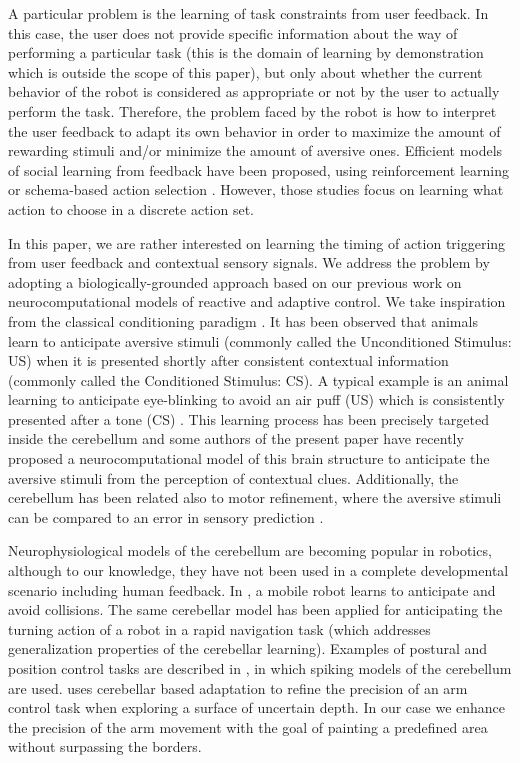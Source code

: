 \documentclass[letterpaper, 10 pt, conference]{ieeeconf}  %
\begin{document}
A particular problem is the learning of task constraints from user feedback. In this case, the user does not provide specific information about the way of performing a particular task (this is the domain of learning by demonstration which is outside the scope of this paper), but only about whether the current behavior of the robot is considered as appropriate or not by the user to actually perform the task. Therefore, the problem faced by the robot is how to interpret the user feedback to adapt its own behavior in order to maximize the amount of rewarding stimuli and/or minimize the amount of aversive ones. Efficient models of social learning from feedback have been proposed, using reinforcement learning \cite{blumberg2002integrated,isbell2001social} or schema-based action selection \cite{kaplan2002robotic}. However, those studies focus on learning what action to choose in a discrete action set.

In this paper, we are rather interested on learning the timing of action triggering from user feedback and contextual sensory signals. We address the problem by adopting a biologically-grounded approach based on our previous work on neurocomputational models of reactive and adaptive control. We take inspiration from the classical conditioning paradigm \cite{pavlov1927conditioned}. It has been observed that animals learn to anticipate aversive stimuli (commonly called the Unconditioned Stimulus: US) when it is presented shortly after consistent contextual information (commonly called the Conditioned Stimulus: CS). A typical example is an animal learning to anticipate eye-blinking to avoid an air puff (US) which is consistently presented after a tone (CS) \cite{gormezano1987classical}. This learning process has been precisely targeted inside the cerebellum \cite{christian2003neural, yeo1998cerebellum} and some authors of the present paper have recently proposed a neurocomputational model of this brain structure \cite{herreros2013nucleo} to anticipate the aversive stimuli from the perception of contextual clues. Additionally, the cerebellum has been related also to motor refinement, where the aversive stimuli can be compared to an error in sensory prediction \cite{houk2003}.

Neurophysiological models of the cerebellum are becoming popular in robotics, although to our knowledge, they have not been used in a complete developmental scenario including human feedback. In \cite{hofstoetter2002cerebellum}, a mobile robot learns to anticipate and avoid collisions. The same cerebellar model has been applied for anticipating the turning action of a robot in a rapid navigation task  \cite{herreros2013speed} (which addresses generalization properties of the cerebellar learning). Examples of postural and position control tasks are described in \cite{pinzon2015realistic}, in which spiking models of the cerebellum are used. \cite{barron2013cerebellum} uses cerebellar based adaptation to refine the precision of an arm control task when exploring a surface of uncertain depth. In our case we enhance the precision of the arm movement with the goal of painting a predefined area without surpassing the borders.  
\end{document}
